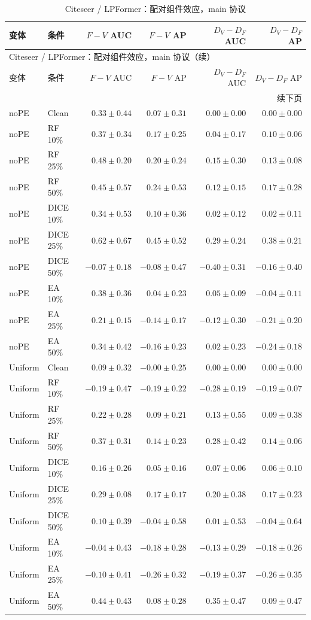{\footnotesize
\setlength{\tabcolsep}{3.2pt}
\renewcommand{\arraystretch}{1.10}
\begin{longtable}{llrrrr}
\caption{Citeseer / LPFormer：配对组件效应，main 协议}\\
\toprule
变体 & 条件 & $F-V$ AUC & $F-V$ AP & $D_V-D_F$ AUC & $D_V-D_F$ AP \\
\midrule
\endfirsthead
\multicolumn{6}{l}{Citeseer / LPFormer：配对组件效应，main 协议（续）}\\
\toprule
变体 & 条件 & $F-V$ AUC & $F-V$ AP & $D_V-D_F$ AUC & $D_V-D_F$ AP \\
\midrule
\endhead
\midrule\multicolumn{6}{r}{续下页}\\
\endfoot
\bottomrule
\endlastfoot
noPE & Clean & $0.33\pm0.44$ & $0.07\pm0.31$ & $0.00\pm0.00$ & $0.00\pm0.00$ \\
noPE & RF 10\% & $0.37\pm0.34$ & $0.17\pm0.25$ & $0.04\pm0.17$ & $0.10\pm0.06$ \\
noPE & RF 25\% & $0.48\pm0.20$ & $0.20\pm0.24$ & $0.15\pm0.30$ & $0.13\pm0.08$ \\
noPE & RF 50\% & $0.45\pm0.57$ & $0.24\pm0.53$ & $0.12\pm0.15$ & $0.17\pm0.28$ \\
noPE & DICE 10\% & $0.34\pm0.53$ & $0.10\pm0.36$ & $0.02\pm0.12$ & $0.02\pm0.11$ \\
noPE & DICE 25\% & $0.62\pm0.67$ & $0.45\pm0.52$ & $0.29\pm0.24$ & $0.38\pm0.21$ \\
noPE & DICE 50\% & $-0.07\pm0.18$ & $-0.08\pm0.47$ & $-0.40\pm0.31$ & $-0.16\pm0.40$ \\
noPE & EA 10\% & $0.38\pm0.36$ & $0.04\pm0.23$ & $0.05\pm0.09$ & $-0.04\pm0.11$ \\
noPE & EA 25\% & $0.21\pm0.15$ & $-0.14\pm0.17$ & $-0.12\pm0.30$ & $-0.21\pm0.20$ \\
noPE & EA 50\% & $0.34\pm0.42$ & $-0.16\pm0.23$ & $0.02\pm0.23$ & $-0.24\pm0.18$ \\
Uniform & Clean & $0.09\pm0.32$ & $-0.00\pm0.25$ & $0.00\pm0.00$ & $0.00\pm0.00$ \\
Uniform & RF 10\% & $-0.19\pm0.47$ & $-0.19\pm0.22$ & $-0.28\pm0.19$ & $-0.19\pm0.07$ \\
Uniform & RF 25\% & $0.22\pm0.28$ & $0.09\pm0.21$ & $0.13\pm0.55$ & $0.09\pm0.38$ \\
Uniform & RF 50\% & $0.37\pm0.31$ & $0.14\pm0.23$ & $0.28\pm0.42$ & $0.14\pm0.06$ \\
Uniform & DICE 10\% & $0.16\pm0.26$ & $0.05\pm0.16$ & $0.07\pm0.06$ & $0.06\pm0.10$ \\
Uniform & DICE 25\% & $0.29\pm0.08$ & $0.17\pm0.17$ & $0.20\pm0.38$ & $0.17\pm0.23$ \\
Uniform & DICE 50\% & $0.10\pm0.39$ & $-0.04\pm0.58$ & $0.01\pm0.53$ & $-0.04\pm0.64$ \\
Uniform & EA 10\% & $-0.04\pm0.43$ & $-0.18\pm0.28$ & $-0.13\pm0.29$ & $-0.18\pm0.26$ \\
Uniform & EA 25\% & $-0.10\pm0.41$ & $-0.26\pm0.32$ & $-0.19\pm0.37$ & $-0.26\pm0.35$ \\
Uniform & EA 50\% & $0.44\pm0.43$ & $0.08\pm0.28$ & $0.35\pm0.47$ & $0.09\pm0.47$ \\
\end{longtable}
}

